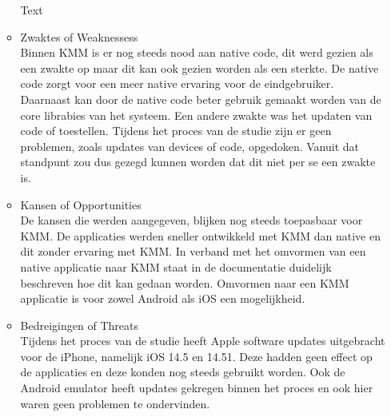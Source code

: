 \begin{itemize}
\begin{itemize}
        Text
        \\
        \item Zwaktes of Weaknessess\\
        Binnen KMM is er nog steeds nood aan native code, dit werd gezien als een zwakte op maar dit kan ook gezien worden als een sterkte. De native code zorgt voor een meer native ervaring voor de eindgebruiker. Daarnaast kan door de native code beter gebruik gemaakt worden van de core librabies van het systeem. Een andere zwakte was het updaten van code of toestellen. Tijdens het proces van de studie zijn er geen problemen, zoals updates van devices of code, opgedoken. Vanuit dat standpunt zou dus gezegd kunnen worden dat dit niet per se een zwakte is.
        \\
        \item Kansen of Opportunities\\
        De kansen die werden aangegeven, blijken nog steeds toepasbaar voor KMM. De applicaties werden sneller ontwikkeld met KMM dan native en dit zonder ervaring met KMM. In verband met het omvormen van een native applicatie naar KMM staat in de documentatie duidelijk beschreven hoe dit kan gedaan worden. Omvormen naar een KMM applicatie is voor zowel Android als iOS een mogelijkheid.
        \\
        \item Bedreigingen of Threats\\
        Tijdens het proces van de studie heeft Apple software updates uitgebracht voor de iPhone, namelijk iOS 14.5 en 14.51. Deze hadden geen effect op de applicaties en deze konden nog steeds gebruikt worden. Ook de Android emulator heeft updates gekregen binnen het proces en ook hier waren geen problemen te ondervinden.
    \end{itemize}
\end{itemize}

